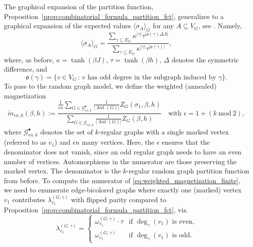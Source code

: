 \documentclass{article}
\numberwithin{theorem}{section}
\theoremstyle{remark}
\DeclareMathOperator{\Aut}{Aut}
\newcommand{\GG}{\mathcal{G}}
\begin{document}
The graphical expansion of the partition function, Proposition~\ref{prop:combinatorial_formula_partition_fct}, generalizes to a graphical expansion of the expected values $\langle \sigma_A \rangle_G$ for any $A \subseteq V_G$, see \cite[\S 2.2]{duminil2016random}. Namely,
\begin{equation*}
  \langle \sigma_A \rangle_G = \frac{\sum_{\gamma \subseteq E_G} \kappa^{|\gamma|} \tau^{|\mathfrak{o}(\gamma) \Delta A|}}{\sum_{\gamma \subseteq E_G} \kappa^{|\gamma|} \tau^{|\mathfrak{o}(\gamma)|}},
\end{equation*}
where, as before, $\kappa = \tanh(\beta J)$, $\tau = \tanh(\beta h)$, $\Delta$ denotes the symmetric difference, and 
\[
  \mathfrak{o}(\gamma) = \{v \in V_G \,:\, v \text{ has odd degree in the subgraph induced by } \gamma\}.
\]
To pass to the random graph model, we define the weighted (annealed) magnetization
\begin{equation}
  \label{eq:weighted_magnetization_finite}
  \widetilde{m}_{\epsilon n,k}(\beta, h) := \frac{\frac{1}{\epsilon n} \sum_{G\in \GG_{\epsilon n,k}^{\bullet}} \frac{1}{|\Aut(G)|} Z_G(\sigma_1,\beta,h)}{\sum_{G\in \GG_{\epsilon n,k}} \frac{1}{|\Aut(G)|} Z_G(\beta,h)} \quad \text{with } \epsilon = 1 + (k ~\mathrm{mod}~ 2), 
\end{equation}
where $\GG_{\epsilon n,k}^{\bullet}$ denotes the set of $k$-regular graphs with a single marked vertex (referred to as $v_1$) and $\epsilon n$ many vertices. Here, the $\epsilon$ ensures that the denominator does not vanish, since an odd regular graph needs to have an even number of vertices. Automorphisms in the numerator are those preserving the marked vertex.
The denominator is the $k$-regular random graph partition function from before. To compute the numerator of \eqref{eq:weighted_magnetization_finite}, we need to enumerate edge-bicolored graphs where exactly one (marked) vertex $v_1$ contributes $\lambda_{v_1}^{(G,\gamma)}$ with flipped parity compared to Proposition~\ref{prop:combinatorial_formula_partition_fct}, viz.\
\begin{equation}
  \label{eq:vtx_weight_flipped}
  \lambda_{v_1}^{(G,\gamma)} = \begin{cases}
    \omega_{v_1}^{(G,\gamma)} \cdot \tau & \text{if } \deg_{\gamma}(v_1) \text{ is even,} \\
    \omega_{v_1}^{(G,\gamma)} & \text{if } \deg_{\gamma}(v_1) \text{ is odd.}
  \end{cases}
\end{equation} 
\end{document}
